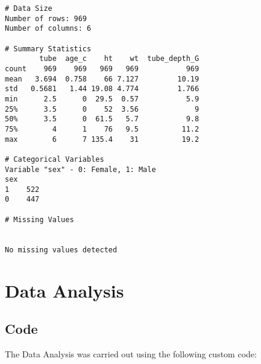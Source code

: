 \documentclass[11pt]{article}
\begin{document}
\begin{Verbatim}[tabsize=4]
# Data Size
Number of rows: 969
Number of columns: 6

# Summary Statistics
        tube  age_c    ht    wt  tube_depth_G
count    969    969   969   969           969
mean   3.694  0.758    66 7.127         10.19
std   0.5681   1.44 19.08 4.774         1.766
min      2.5      0  29.5  0.57           5.9
25%      3.5      0    52  3.56             9
50%      3.5      0  61.5   5.7           9.8
75%        4      1    76   9.5          11.2
max        6      7 135.4    31          19.2

# Categorical Variables
Variable "sex" - 0: Female, 1: Male
sex
1    522
0    447

# Missing Values


No missing values detected

\end{Verbatim}

\section{Data Analysis}
\subsection{{Code}}
The Data Analysis was carried out using the following custom code:
\end{document}
